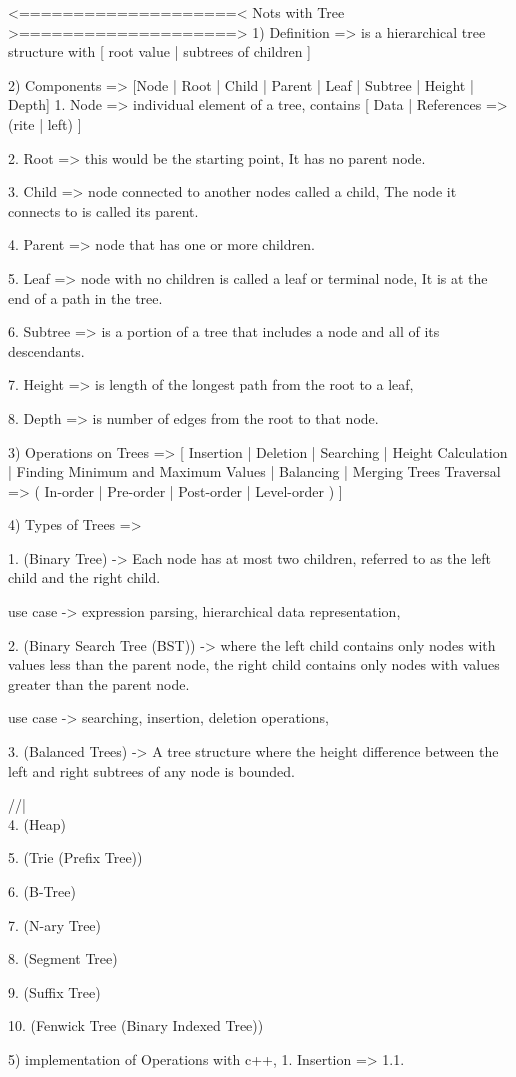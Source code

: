 




<====================< Nots with Tree >====================>
1) Definition => is a hierarchical tree structure with [ root value | subtrees of children ]

2) Components => [Node | Root | Child | Parent | Leaf | Subtree | Height | Depth]
   1. Node => individual element of a tree, contains [ Data | References => (rite | left)  ]

   2. Root => this would be the starting point, It has no parent node.

   3. Child => node connected to another nodes called a child, 
               The node it connects to is called its parent.

   4. Parent => node that has one or more children.

   5. Leaf => node with no children is called a leaf or terminal node,
              It is at the end of a path in the tree.

   6. Subtree => is a portion of a tree that includes a node and all of its descendants.

   7. Height => is length of the longest path from the root to a leaf,

   8. Depth => is number of edges from the root to that node.

3) Operations on Trees => [ Insertion | Deletion | Searching | Height Calculation | 
                            Finding Minimum and Maximum Values | Balancing | Merging Trees
                            Traversal => ( In-order | Pre-order | Post-order | Level-order ) ]

4) Types of Trees => 

   1. (Binary Tree) -> Each node has at most two children,
                     referred to as the left child and the right child.

       use case -> expression parsing, hierarchical data representation,

   2. (Binary Search Tree (BST)) -> where the left child contains only nodes with values less than the parent node,
                                    the right child contains only nodes with values greater than the parent node.

        use case -> searching, insertion, deletion operations,

   3. (Balanced Trees) -> A tree structure where the height difference
                          between the left and right subtrees of any node is bounded.

        //|\\

   4. (Heap)
   
   5. (Trie (Prefix Tree))

   6. (B-Tree)

   7. (N-ary Tree)

   8. (Segment Tree)

   9. (Suffix Tree)

   10. (Fenwick Tree (Binary Indexed Tree))

5) implementation of Operations with c++,
   1. Insertion => 
      1.1. 

   




